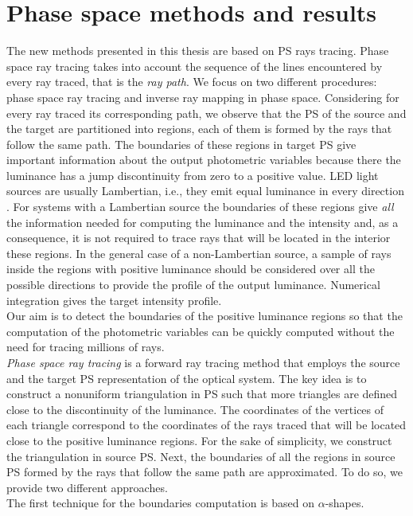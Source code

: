 \section{Phase space methods and results}
The new methods presented in this thesis are based on PS rays tracing.
Phase space ray tracing takes into account the sequence of the lines encountered by every ray traced, that is the \textit{ray path}. We focus on two different procedures: phase space ray tracing and inverse ray mapping in phase space. 
Considering for every ray traced its corresponding path, we observe that the PS of the source and the target are partitioned into regions, each of them is formed by the rays that follow the same path. The boundaries of these regions in target PS give important information about the output photometric variables because there the luminance has a jump discontinuity from zero to a positive value. LED light sources are usually Lambertian, i.e., they emit equal luminance in every direction \cite{taylor2000illumination}. For systems with a Lambertian source the boundaries of these regions give \textit{all} the information needed for computing the luminance and the intensity and, as a consequence, it is not required to trace rays that will be located in the interior these regions.
In the general case of a non-Lambertian source, a sample of rays inside the regions with positive luminance should be considered over all the possible directions to provide the profile of the output luminance. Numerical integration gives the target intensity profile. 
\\ \indent 
Our aim is to detect the boundaries of the positive luminance regions so that the computation of the photometric variables can be quickly computed without the need for tracing millions of rays. \\ \indent
\textit{Phase space ray tracing} is a forward ray tracing method that employs the source and the target PS representation of the optical system. The key idea is to construct a nonuniform triangulation in PS such that more triangles are defined close to the discontinuity of the luminance. The coordinates of the vertices of each triangle correspond to the coordinates of the rays traced that will be located close to the positive luminance regions. For the sake of simplicity, we construct the triangulation in source PS. Next, the boundaries of all the regions in source PS formed by the rays that follow the same path are approximated. To do so, we provide two different approaches. \\ \indent
The first technique for the boundaries computation is based on $\alpha$-shapes. 
